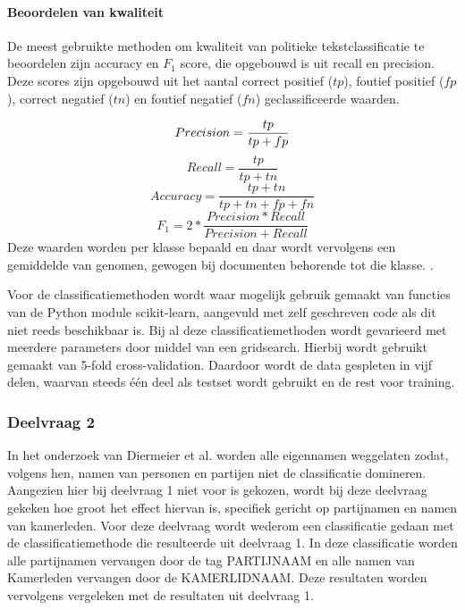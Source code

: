 \paragraph{Beoordelen van kwaliteit}
De meest gebruikte methoden om kwaliteit van politieke tekstclassificatie te beoordelen zijn accuracy en $F_1$ score, die opgebouwd is uit recall en precision. Deze scores zijn opgebouwd uit het aantal correct positief ($tp$), foutief positief ($fp$), correct negatief ($tn$) en foutief negatief ($fn$) geclassificeerde waarden.\par
\begin{equation}
    Precision = \frac{tp}{tp + fp}\\
\end{equation}
\begin{equation}
    Recall = \frac{tp}{tp + tn}
\end{equation}
\begin{equation}
    Accuracy = \frac{tp + tn}{tp + tn + fp + fn}
\end{equation}
\begin{equation}
    F_1 = 2 * \frac{Precision * Recall}{Precision + Recall}
\end{equation}
Deze waarden worden per klasse bepaald en daar wordt vervolgens een gemiddelde van genomen, gewogen bij documenten behorende tot die klasse.  \cite{Manning:2008:IIR:1394399,scikit-learn}.\par
\bigskip
Voor de classificatiemethoden wordt waar mogelijk gebruik gemaakt van functies van de Python module scikit-learn\cite{scikit-learn}, aangevuld met zelf geschreven code als dit niet reeds beschikbaar is. Bij al deze classificatiemethoden wordt gevarieerd met meerdere parameters door middel van een gridsearch. Hierbij wordt gebruikt gemaakt van 5-fold cross-validation. Daardoor wordt de data gespleten in vijf delen, waarvan steeds één deel als testset wordt gebruikt en de rest voor training.

\subsubsection{Deelvraag 2}
In het onderzoek van Diermeier et al. worden alle eigennamen weggelaten zodat, volgens hen, namen van personen en partijen niet de classificatie domineren. Aangezien hier bij deelvraag 1 niet voor is gekozen, wordt bij deze deelvraag gekeken hoe groot het effect hiervan is, specifiek gericht op partijnamen en namen van kamerleden. Voor deze deelvraag wordt wederom een classificatie gedaan met de classificatiemethode die resulteerde uit deelvraag 1. In deze classificatie worden alle partijnamen vervangen door de tag PARTIJNAAM en alle namen van Kamerleden vervangen door de KAMERLIDNAAM. Deze resultaten worden vervolgens vergeleken met de resultaten uit deelvraag 1. 


